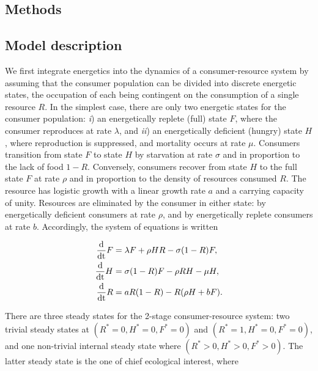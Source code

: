 \documentclass[12pt,english]{article}
\begin{document}
\begin{spacing}{1.9}


\section{Methods}
\subsection{Model description}

We first integrate energetics into the dynamics of a consumer-resource system by assuming that the consumer population can be divided into discrete energetic states, the occupation of each being contingent on the consumption of a single resource $R$.
In the simplest case, there are only two energetic states for the consumer population: \emph{i}) an energetically replete (full) state $F$, where the consumer reproduces at rate $\lambda$, and \emph{ii}) an energetically deficient (hungry) state $H$, where reproduction is suppressed, and mortality occurs at rate $\mu$.
Consumers transition from state $F$ to state $H$ by starvation at rate $\sigma$ and in proportion to the lack of food $1-R$.
Conversely, consumers recover from state $H$ to the full state $F$ at rate $\rho$ and in proportion to the density of resources consumed $R$.
The resource has logistic growth with a linear growth rate $a$ and a carrying capacity of unity.
Resources are eliminated by the consumer in either state: by energetically deficient consumers at rate $\rho$, and by energetically replete consumers at rate $b$.
Accordingly, the system of equations is written

\begin{align}
\frac{\rm d}{\rm dt} F &= \lambda F + \rho HR - \sigma (1-R)F, \nonumber \\
\frac{\rm d}{\rm dt} H &= \sigma (1-R)F - \rho RH - \mu H, \nonumber \\
\frac{\rm d}{\rm dt} R &= a R(1-R) - R(\rho H+ b F).
\label{eq_specific}
\end{align}

There are three steady states for the 2-stage consumer-resource system: two trivial steady states at $(R^*=0,H^*=0,F^*=0)$ and $(R^*=1,H^*=0,F^*=0)$, and one non-trivial internal steady state where $(R^*>0,H^*>0,F^*>0)$.
The latter steady state is the one of chief ecological interest, where


\end{spacing}
\end{document}

